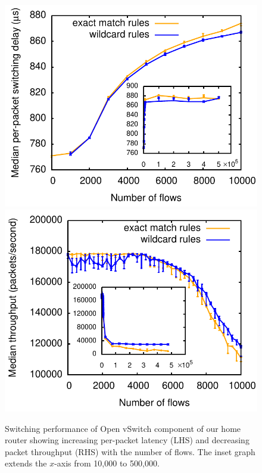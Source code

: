 \begin{figure}
\centering
\includegraphics[width=0.95\columnwidth]{switching-delay}
\hspace{\columnsep}
\includegraphics[width=0.95\columnwidth]{throughput}
\caption{\label{f:performance}Switching performance of Open vSwitch
        component of our home router showing increasing per-packet
        latency (LHS) and decreasing packet throughput (RHS) with the
        number of flows.  The inset graph extends the $x$-axis from
        10,000 to 500,000.} 
\vspace{-1em}
\end{figure}

